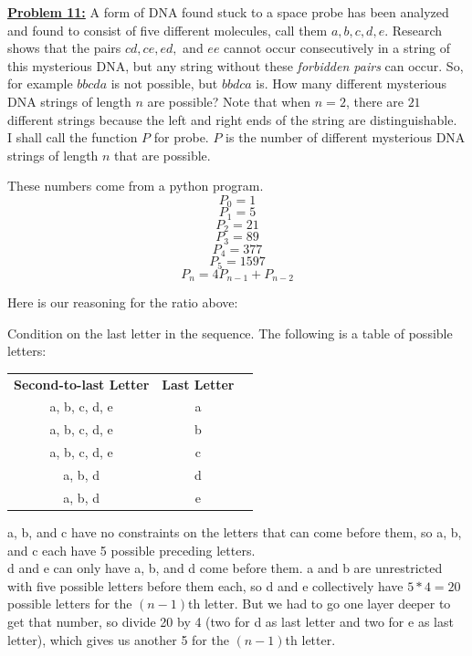 \documentclass[10pt, AMS Euler]{article}
\begin{document}
	\noindent\underline{\bf Problem 11:}  A form of DNA found stuck to a space probe has been analyzed and found to consist of five different molecules, call them $a,b,c,d,e$.  Research shows that the pairs $cd, ce, ed,$ and $ee$ cannot occur consecutively in a string of this mysterious DNA, but any string without these \emph{forbidden pairs} can occur.  
	So, for example $bbcda$ is not possible, but $bbdca$ is.  How many different mysterious DNA strings of length $n$ are possible?  Note that when $n=2$, there are $21$ different strings because the left and right ends of the string are distinguishable.\\
    
    I shall call the function $P$ for probe. $P$ is the number of different mysterious DNA strings of length $n$ that are possible. 

    These numbers come from a python program. 
    $$ P_0 = 1 $$ 
    $$ P_1 = 5 $$
    $$ P_2 = 21 $$
    $$ P_3 = 89 $$
    $$ P_4 = 377 $$
    $$ P_5 = 1597 $$
    $$ P_n = 4P_{n-1} + P_{n-2} $$


    Here is our reasoning for the ratio above:

    Condition on the last letter in the sequence. The following is a table of possible letters:\\

    \begin{table}[h]
    \centering
    \begin{tabular}{|c|c|c|}
        \hline
        \textbf{Second-to-last Letter} & \textbf{Last Letter} \\
        a, b, c, d, e & a \\
        \hline
        a, b, c, d, e & b \\
        \hline
        a, b, c, d, e & c \\
        \hline
        a, b, d & d \\
        \hline
        a, b, d & e \\
        \hline
    \end{tabular}
    \end{table}

    a, b, and c have no constraints on the letters that can come before them, so a, b, and c each have 5 possible preceding letters.\\

    d and e can only have a, b, and d come before them. a and b are unrestricted with five possible letters before them each, so d and e collectively have $5 * 4 = 20$ possible letters for the $(n-1)$th letter. But we had to go one layer deeper to get that number, so divide 20 by 4 (two for d as last letter and two for e as last letter), which gives us another 5 for the $(n-1)$th letter.\\
\end{document}
